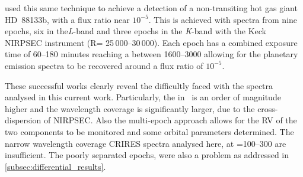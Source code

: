 \citep{piskorz_evidence_2016} used this same technique to achieve a detection of a non-transiting hot gas giant {HD~88133}b, with a flux ratio near \(10^{-5}\).
This is achieved with spectra from nine epochs, six in the\emph{L}-band and three epochs in the \emph{K}-band with the Keck {NIRPSEC} instrument (R= 25\,000--30\,000).
Each epoch has a combined exposure time of 60--180 minutes reaching a \snr{} between 1600--3000 allowing for the planetary emission spectra to be recovered around a flux ratio of \(10^{-5}\).

These successful works clearly reveal the difficultly faced with the spectra analysed in this current work.
Particularly, the \snr{} in~\citep{piskorz_evidence_2016} is an order of magnitude higher and the wavelength coverage is significantly larger, due to the cross-dispersion of {NIRPSEC}.
Also the multi-epoch approach allows for the {RV} of the two components to be monitored and some orbital parameters determined.
The narrow wavelength coverage CRIRES spectra analysed here, at \snr{}=100--300 are insufficient.
The poorly separated epochs, were also a problem as addressed in \cref{subsec:differential_results}.


